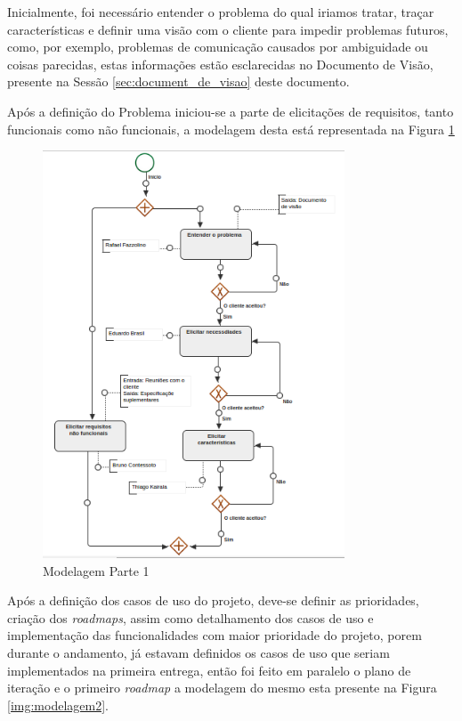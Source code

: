 
Inicialmente, foi necessário entender o problema do qual iriamos tratar, traçar características e definir uma visão com o cliente para impedir problemas futuros, como, por exemplo, problemas de comunicação causados por ambiguidade ou coisas parecidas, estas informações estão esclarecidas no Documento de Visão, presente na Sessão \ref{sec:document_de_visao} deste documento.

Após a definição do Problema iniciou-se a parte de elicitações de requisitos, tanto funcionais como não funcionais, a modelagem desta está representada na Figura \ref{img:modelagem1}

\begin{figure}[H]
	\centering
	\includegraphics[width=0.8\textwidth]{imgModelagem/modelagem1}
	\caption{Modelagem Parte 1}
	\label{img:modelagem1}
\end{figure}


Após a definição dos casos de uso do projeto, deve-se definir as prioridades, criação dos \textit{roadmaps}, assim como detalhamento dos casos de uso e implementação das funcionalidades com maior prioridade do projeto, porem durante o andamento, já estavam definidos os casos de uso que seriam implementados na primeira entrega, então foi feito em paralelo o plano de iteração e o primeiro \textit{roadmap} a modelagem do mesmo esta presente na Figura \ref{img:modelagem2}.

